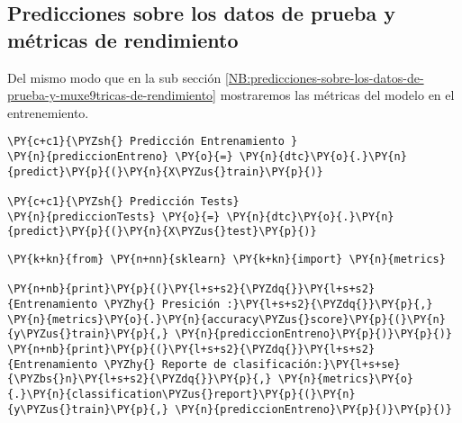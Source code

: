     \hypertarget{predicciones-sobre-los-datos-de-prueba-y-muxe9tricas-de-rendimiento}{%
\subsection{Predicciones sobre los datos de prueba y métricas de rendimiento}\label{predicciones-sobre-los-datos-de-prueba-y-muxe9tricas-de-rendimiento}}

	Del mismo modo que en la sub sección \ref{NB:predicciones-sobre-los-datos-de-prueba-y-muxe9tricas-de-rendimiento} mostraremos las métricas del modelo en el entrenemiento.

    \begin{tcolorbox}[breakable, size=fbox, boxrule=1pt, pad at break*=1mm,colback=cellbackground, colframe=cellborder]
\begin{Verbatim}[commandchars=\\\{\}]
\PY{c+c1}{\PYZsh{} Predicción Entrenamiento }
\PY{n}{prediccionEntreno} \PY{o}{=} \PY{n}{dtc}\PY{o}{.}\PY{n}{predict}\PY{p}{(}\PY{n}{X\PYZus{}train}\PY{p}{)}

\PY{c+c1}{\PYZsh{} Predicción Tests}
\PY{n}{prediccionTests} \PY{o}{=} \PY{n}{dtc}\PY{o}{.}\PY{n}{predict}\PY{p}{(}\PY{n}{X\PYZus{}test}\PY{p}{)}
\end{Verbatim}
\end{tcolorbox}

    \begin{tcolorbox}[breakable, size=fbox, boxrule=1pt, pad at break*=1mm,colback=cellbackground, colframe=cellborder]
\begin{Verbatim}[commandchars=\\\{\}]
\PY{k+kn}{from} \PY{n+nn}{sklearn} \PY{k+kn}{import} \PY{n}{metrics}

\PY{n+nb}{print}\PY{p}{(}\PY{l+s+s2}{\PYZdq{}}\PY{l+s+s2}{Entrenamiento \PYZhy{} Presición :}\PY{l+s+s2}{\PYZdq{}}\PY{p}{,} \PY{n}{metrics}\PY{o}{.}\PY{n}{accuracy\PYZus{}score}\PY{p}{(}\PY{n}{y\PYZus{}train}\PY{p}{,} \PY{n}{prediccionEntreno}\PY{p}{)}\PY{p}{)}
\PY{n+nb}{print}\PY{p}{(}\PY{l+s+s2}{\PYZdq{}}\PY{l+s+s2}{Entrenamiento \PYZhy{} Reporte de clasificación:}\PY{l+s+se}{\PYZbs{}n}\PY{l+s+s2}{\PYZdq{}}\PY{p}{,} \PY{n}{metrics}\PY{o}{.}\PY{n}{classification\PYZus{}report}\PY{p}{(}\PY{n}{y\PYZus{}train}\PY{p}{,} \PY{n}{prediccionEntreno}\PY{p}{)}\PY{p}{)}
\end{Verbatim}
\end{tcolorbox}


